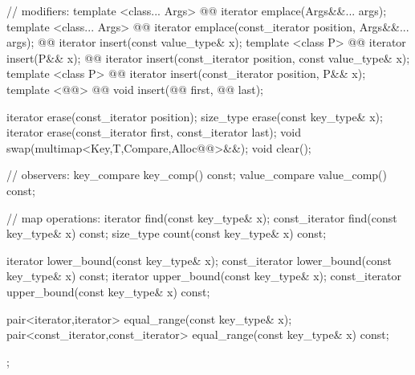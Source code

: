 \documentclass[american,twoside]{book}
\begin{document}
\begin{codeblock}
{{    // modifiers:
    template <class... Args>
      @@
      iterator emplace(Args&&... args);
    template <class... Args> 
      @@
      iterator emplace(const_iterator position, Args&&... args);
    @@ 
      iterator insert(const value_type& x);
    template <class P> 
      @@
      iterator insert(P&& x);
    @@ 
      iterator insert(const_iterator position, const value_type& x);
    template <class P> 
      @@
      iterator insert(const_iterator position, P&& x);
    template <@@>
      @@
      void insert(@@ first, @@ last);

    iterator  erase(const_iterator position);
    size_type erase(const key_type& x);
    iterator  erase(const_iterator first, const_iterator last);
    void swap(multimap<Key,T,Compare,Alloc@@>&&);
    void clear();

    // observers:
    key_compare    key_comp() const;
    value_compare  value_comp() const;

    // map operations:
    iterator       find(const key_type& x);
    const_iterator find(const key_type& x) const;
    size_type      count(const key_type& x) const;

    iterator       lower_bound(const key_type& x);
    const_iterator lower_bound(const key_type& x) const;
    iterator       upper_bound(const key_type& x);
    const_iterator upper_bound(const key_type& x) const;

    pair<iterator,iterator>
      equal_range(const key_type& x);
    pair<const_iterator,const_iterator>
      equal_range(const key_type& x) const;
  };

}
\end{codeblock}
\end{document}
